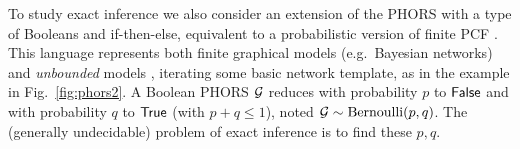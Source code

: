 \documentclass{easychair}
\begin{document}
To study exact inference we also consider an extension of the PHORS with a type of Booleans and if-then-else, equivalent to a probabilistic version of finite PCF \cite{LOADER2001341}. This language represents both finite graphical models (e.g.~Bayesian networks) and \emph{unbounded} models \cite[Ch.~6]{Daphne2009}, iterating some basic network template, as in the example in Fig.~\ref{fig:phors2}.
A Boolean PHORS $\mathcal{G}$ reduces with probability $p$ to $\mathsf{False}$ and with probability $q$ to $\mathsf{True}$ (with $p+q \leq 1$), noted $\mathcal{G}\sim \text{Bernoulli}(p,q)$. The (generally undecidable) problem of exact inference is to find these $p,q$. 


\begin{figure}
\end{figure}
\end{document}
